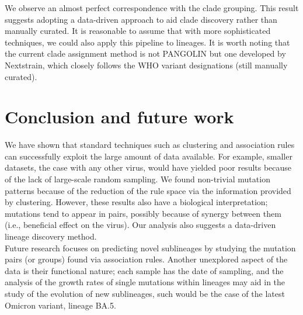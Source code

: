 \documentclass[twoside,twocolumn]{article}
\begin{document}
	We observe an almost perfect correspondence with the clade grouping. This result suggests adopting a data-driven approach to aid clade discovery rather than manually curated. It is reasonable to assume that with more sophisticated techniques, we could also apply this pipeline to lineages. 
	It is worth noting that the current clade assignment method is not PANGOLIN but one developed by Nextstrain\cite{cladeassignment}, which closely follows the WHO variant designations (still manually curated). 
	\section{Conclusion and future work}
	We have shown that standard techniques such as clustering and association rules can successfully exploit the large amount of data available. For example, smaller datasets, the case with any other virus, would have yielded poor results because of the lack of large-scale random sampling. We found non-trivial mutation patterns because of the reduction of the rule space via the information provided by clustering. However, these results also have a biological interpretation; mutations tend to appear in pairs, possibly because of synergy between them (i.e., beneficial effect on the virus). Our analysis also suggests a data-driven lineage discovery method. 	
	\\
	Future research focuses on predicting novel sublineages by studying the mutation pairs (or groups) found via association rules. Another unexplored aspect of the data is their functional nature; each sample has the date of sampling, and the analysis of the growth rates of single mutations within lineages may aid in the study of the evolution of new sublineages, such would be the case of the latest Omicron variant, lineage BA.5.
	\newpage
\end{document}
